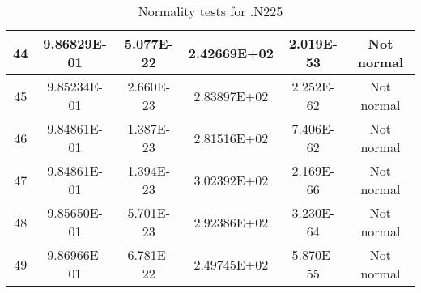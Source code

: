 \begin{table}[h]
\begin{tabular}{|c|c|c|c|c|c|}
		44 & 9.86829E-01 & 5.077E-22 & 2.42669E+02 & 2.019E-53 & Not normal\\\hline
		45 & 9.85234E-01 & 2.660E-23 & 2.83897E+02 & 2.252E-62 & Not normal\\\hline
		46 & 9.84861E-01 & 1.387E-23 & 2.81516E+02 & 7.406E-62 & Not normal\\\hline
		47 & 9.84861E-01 & 1.394E-23 & 3.02392E+02 & 2.169E-66 & Not normal\\\hline
		48 & 9.85650E-01 & 5.701E-23 & 2.92386E+02 & 3.230E-64 & Not normal\\\hline
		49 & 9.86966E-01 & 6.781E-22 & 2.49745E+02 & 5.870E-55 & Not normal\\\hline
	\end{tabular}
	\caption{Normality tests for .N225}
\end{table}
